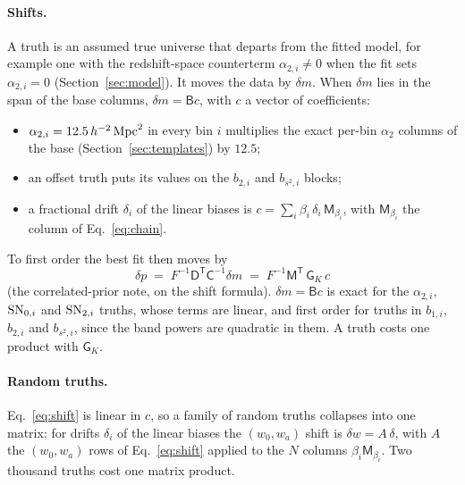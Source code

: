 \documentclass[11pt]{article}
\newcommand{\Cov}{\mathsf{C}}
\newcommand{\T}{^{\mathsf{T}}}
\newcommand{\aunit}{\,h^{-2}\,{\rm Mpc}^2}
\newcommand{\SNzi}{{\rm SN}_{0,i}}
\newcommand{\SNti}{{\rm SN}_{2,i}}
\newcommand{\mB}{\mathsf{B}}
\newcommand{\mM}{\mathsf{M}}
\newcommand{\mD}{\mathsf{D}}
\newcommand{\mG}{\mathsf{G}}
\begin{document}
\paragraph{Shifts.}
A truth is an assumed true universe that departs from the fitted model,
for example one with the redshift-space counterterm
$\alpha_{2,i} \neq 0$ when the fit sets $\alpha_{2,i} = 0$
(Section~\ref{sec:model}).  It moves the data by $\delta m$.  When
$\delta m$ lies in the span of the base columns,
$\delta m = \mB c$, with $c$ a vector of coefficients:
\begin{itemize}
  \item $\alpha_{2,i} = 12.5\aunit$ in every bin $i$ multiplies the
    exact per-bin $\alpha_2$ columns of the base
    (Section~\ref{sec:templates}) by $12.5$;
  \item an offset truth puts its values on the $b_{2,i}$ and
    $b_{s^2,i}$ blocks;
  \item a fractional drift $\delta_i$ of the linear biases is
    $c = \sum_i \beta_i\,\delta_i\, \mM_{\beta_i}$, with
    $\mM_{\beta_i}$ the column of Eq.~\eqref{eq:chain}.
\end{itemize}
To first order the best fit then moves by
\begin{equation}
  \delta p \;=\; F^{-1} \mD\T \Cov^{-1} \delta m
  \;=\; F^{-1} \mM\T\, \mG_K\, c
  \label{eq:shift}
\end{equation}
(the correlated-prior note, on the shift formula).  $\delta m = \mB c$
is exact for the $\alpha_{2,i}$, $\SNzi$ and $\SNti$ truths, whose terms
are linear, and first order for truths in $b_{1,i}$, $b_{2,i}$ and
$b_{s^2,i}$, since the band powers are quadratic in them.  A truth costs
one product with $\mG_K$.

\paragraph{Random truths.}
Eq.~\eqref{eq:shift} is linear in $c$, so a family of random truths
collapses into one matrix: for drifts $\delta_i$ of the linear biases
the $(w_0, w_a)$ shift is $\delta w = A\,\delta$, with $A$ the
$(w_0, w_a)$ rows of Eq.~\eqref{eq:shift} applied to the $N$ columns
$\beta_i \mM_{\beta_i}$.  Two thousand truths cost one matrix product.
\end{document}
